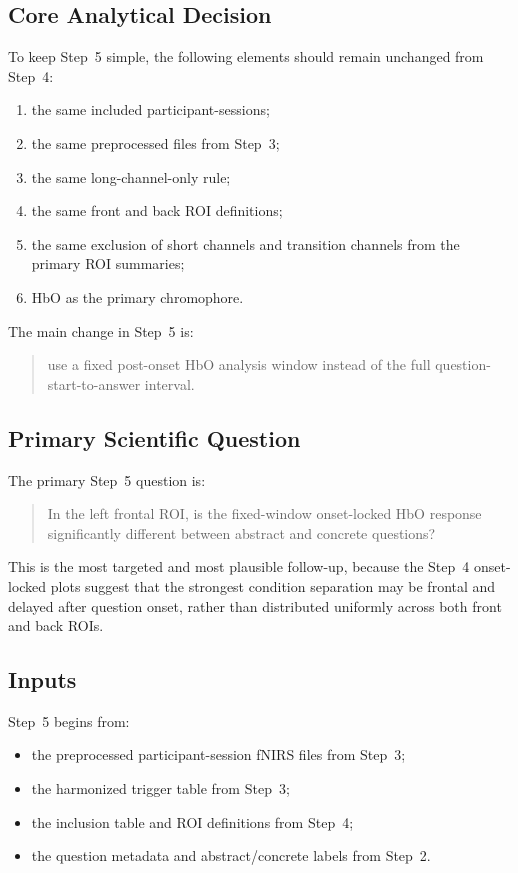 \documentclass[11pt]{article}
\begin{document}
\subsection{Core Analytical Decision}
To keep Step~5 simple, the following elements should remain unchanged from Step~4:
\begin{enumerate}
    \item the same included participant-sessions;
    \item the same preprocessed files from Step~3;
    \item the same long-channel-only rule;
    \item the same front and back ROI definitions;
    \item the same exclusion of short channels and transition channels from the primary ROI summaries;
    \item HbO as the primary chromophore.
\end{enumerate}

The main change in Step~5 is:
\begin{quote}
use a fixed post-onset HbO analysis window instead of the full question-start-to-answer interval.
\end{quote}

\subsection{Primary Scientific Question}
The primary Step~5 question is:
\begin{quote}
In the left frontal ROI, is the fixed-window onset-locked HbO response significantly different
between abstract and concrete questions?
\end{quote}

This is the most targeted and most plausible follow-up, because the Step~4 onset-locked plots suggest
that the strongest condition separation may be frontal and delayed after question onset, rather than
distributed uniformly across both front and back ROIs.

\subsection{Inputs}
Step~5 begins from:
\begin{itemize}
    \item the preprocessed participant-session fNIRS files from Step~3;
    \item the harmonized trigger table from Step~3;
    \item the inclusion table and ROI definitions from Step~4;
    \item the question metadata and abstract/concrete labels from Step~2.
\end{itemize}
\end{document}
